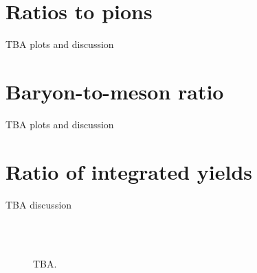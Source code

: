 \section{Ratios to pions}

TBA plots and discussion

\section{Baryon-to-meson ratio}

TBA plots and discussion

\section{Ratio of integrated yields}

TBA discussion

\begin{figure}[!htb]
\centering%
\\
\\
\caption{TBA.}
\label{fig:sphero:lvssOpt}
\end{figure}
